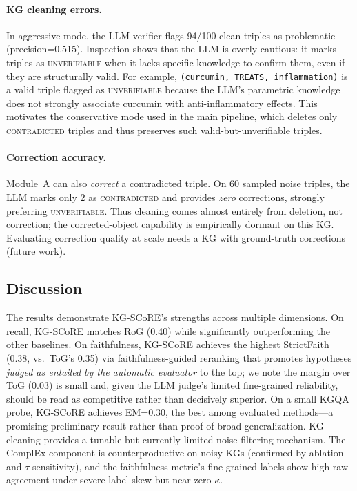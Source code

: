 \paragraph{KG cleaning errors.}
In aggressive mode, the LLM verifier flags 94/100 clean triples as problematic (precision=0.515). Inspection shows that the LLM is overly cautious: it marks triples as \textsc{unverifiable} when it lacks specific knowledge to confirm them, even if they are structurally valid. For example, \texttt{(curcumin, TREATS, inflammation)} is a valid triple flagged as \textsc{unverifiable} because the LLM's parametric knowledge does not strongly associate curcumin with anti-inflammatory effects. This motivates the conservative mode used in the main pipeline, which deletes only \textsc{contradicted} triples and thus preserves such valid-but-unverifiable triples.

\paragraph{Correction accuracy.}
Module~A can also \emph{correct} a contradicted triple. On 60 sampled noise triples, the LLM marks only 2 as \textsc{contradicted} and provides \emph{zero} corrections, strongly preferring \textsc{unverifiable}. Thus cleaning comes almost entirely from deletion, not correction; the corrected-object capability is empirically dormant on this KG. Evaluating correction quality at scale needs a KG with ground-truth corrections (future work).

\subsection{Discussion}
The results demonstrate KG-SCoRE's strengths across multiple dimensions. On recall, KG-SCoRE matches RoG (0.40) while significantly outperforming the other baselines. On faithfulness, KG-SCoRE achieves the highest StrictFaith (0.38, vs.\ ToG's 0.35) via faithfulness-guided reranking that promotes hypotheses \emph{judged as entailed by the automatic evaluator} to the top; we note the margin over ToG (0.03) is small and, given the LLM judge's limited fine-grained reliability, should be read as competitive rather than decisively superior. On a small KGQA probe, KG-SCoRE achieves EM=0.30, the best among evaluated methods---a promising preliminary result rather than proof of broad generalization. KG cleaning provides a tunable but currently limited noise-filtering mechanism. The ComplEx component is counterproductive on noisy KGs (confirmed by ablation and $\tau$ sensitivity), and the faithfulness metric's fine-grained labels show high raw agreement under severe label skew but near-zero $\kappa$.

